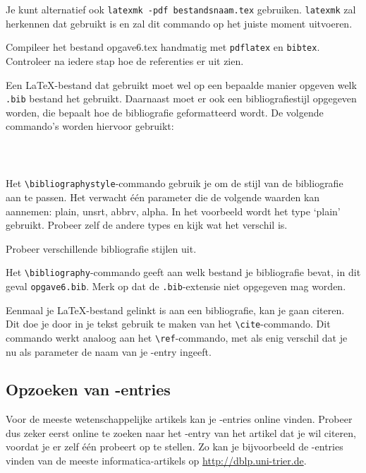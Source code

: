 \documentclass[12pt, dutch]{article}
\newcommand{\bs}{\textbackslash}
\begin{document}
Je kunt alternatief ook \texttt{latexmk -pdf bestandsnaam.tex} gebruiken.
\texttt{latexmk} zal herkennen dat \BibTeX{} gebruikt is en zal dit commando op
het juiste moment uitvoeren.

\begin{tcolorbox}[title=Opgave 6a]
  Compileer het bestand opgave6.tex handmatig met \texttt{pdflatex} en
  \texttt{bibtex}. Controleer na iedere stap hoe de referenties er uit zien.
\end{tcolorbox}

Een \LaTeX{}-bestand dat \BibTeX{} gebruikt moet wel op een bepaalde manier
opgeven welk \texttt{.bib} bestand het gebruikt. Daarnaast moet er ook een
bibliografiestijl opgegeven worden, die bepaalt hoe de bibliografie
geformatteerd wordt. De volgende commando's worden hiervoor gebruikt:

\begin{verbatim}
  
  
\end{verbatim}

Het \texttt{\bs{}bibliographystyle}-commando gebruik je om
de stijl van de bibliografie aan te passen. Het verwacht \'e\'en
parameter die de volgende waarden kan aannemen: plain, unsrt, abbrv,
alpha. In het voorbeeld wordt het type `plain' gebruikt.
Probeer zelf de andere types en kijk wat het verschil is.
\begin{tcolorbox}[title=Opgave 6b]
  Probeer verschillende bibliografie stijlen uit.
\end{tcolorbox}

Het \texttt{\bs{}bibliography}-commando geeft aan welk
bestand je bibliografie bevat, in dit geval \texttt{opgave6.bib}. Merk op dat
de \texttt{.bib}-extensie niet opgegeven mag worden.

Eenmaal je \LaTeX-bestand gelinkt is aan een bibliografie, kan je
gaan citeren. Dit doe je door in je tekst gebruik te maken van het
\texttt{\bs{}cite}-commando. Dit commando werkt analoog aan
het \texttt{\bs{}ref}-commando, met als enig verschil dat
je nu als parameter de naam van je \BibTeX-entry ingeeft.

\subsection{Opzoeken van \BibTeX-entries}

Voor de meeste wetenschappelijke artikels kan je \BibTeX-entries
online vinden. Probeer dus zeker eerst online te zoeken naar het
\BibTeX-entry van het artikel dat je wil citeren, voordat je er zelf
\'e\'en probeert op te stellen. Zo kan je bijvoorbeeld de
\BibTeX-entries vinden van de meeste informatica-artikels op
\url{http://dblp.uni-trier.de}.
\end{document}

